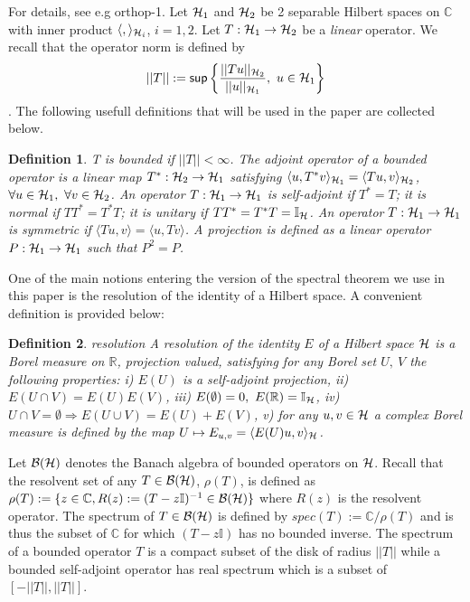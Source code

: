 \documentclass[10pt]{book}
\renewcommand{\sup}{\mathsf{sup}}
\theoremstyle{break}
\newtheorem{definition}{Definition}
\begin{document}

For details, see e.g {orthop-1}. Let ${\cal{H}}_1$ and ${\cal{H}}_2$ be 2 separable Hilbert spaces on $\mathbb{C}$ with inner product $\langle, \rangle_{{\cal{H}}_i}$, $i=1,2$. Let $T:{\cal{H}}_1\to{\cal{H}}_2$ be a {\it{linear}} operator. We recall that the operator norm is defined by $$||T||:=\sup\left\{\frac{||Tu||_{{\cal{H}}_2}}{||u||_{{\cal{H}}_1}},\ u\in{\cal{H}}_1 \right\}$$. The following usefull definitions that will be used in the paper are collected below.

\begin{definition}
T is bounded if $||T||<\infty$. The adjoint operator of a bounded operator is a linear map $T^*:{\cal{H}}_2\to{\cal{H}}_1$ satisfying $\langle u, T^*v\rangle_{{\cal{H}}_1}=\langle Tu,v \rangle_{{\cal{H}}_2}$, $\forall u\in{\cal{H}}_1,\ \forall v\in{\cal{H}}_2$. An operator $T:{\cal{H}}_1\to{\cal{H}}_1$ is 
self-adjoint if $T^*=T$; it is normal if $TT^*=T^*T$; it is unitary if $TT^*=T^*T=\mathbb{I}_{\cal{H}}$. An operator $T:{\cal{H}}_1\to{\cal{H}}_1$ is symmetric if $\langle Tu,v \rangle=\langle u,Tv\rangle$. A projection is defined as a linear operator $P:{\cal{H}}_1\to{\cal{H}}_1$ such that $P^2=P$.
\end{definition}

One of the main notions entering the version of the spectral theorem we use in this paper is the resolution of the identity of a Hilbert space. A convenient definition is provided below:
\begin{definition}{resolution}
A resolution of the identity $E$ of a Hilbert space ${\cal{H}}$ is a Borel measure on $\mathbb{R}$, projection valued, satisfying for any Borel set $U,\ V$ the following properties: i) $E(U)$ is a self-adjoint projection, ii) $E(U\cap V)=E(U)E(V)$, iii) $E(\emptyset)=0,\ E(\mathbb{R})=\mathbb{I}_{{\cal{H}}}$, iv) $U\cap V=\emptyset\Rightarrow E(U\cup V)=E(U)+E(V)$, v) for any $u,v\in\cal{H}$ a complex Borel measure is defined by the map $U\mapsto E_{u,v}=\langle E(U)u,v \rangle_{\cal{H}}$.
\end{definition}
Let ${\cal{B}}({\cal{H}})$ denotes the Banach algebra of bounded operators on ${\cal{H}}$. Recall that the resolvent set of any $T\in{\cal{B}}({\cal{H}})$, $\rho(T)$, is defined as $\rho(T):=\{z\in\mathbb{C}, R(z):=(T-z\mathbb{I})^{-1}\in{\cal{B}}({\cal{H}})  \}$ where $R(z)$ is the resolvent operator. The spectrum of $T\in{\cal{B}}({\cal{H}})$ is defined by $spec(T):=\mathbb{C}/\rho(T)$ and is thus the subset of $\mathbb{C}$ for which $(T-z\mathbb{I})$ has no bounded inverse. The spectrum of a bounded operator $T$ is a compact subset of the disk of radius $||T||$ while a bounded self-adjoint operator has real spectrum which is a subset of 
$[-||T||,||T||]$.\par
\end{document}
